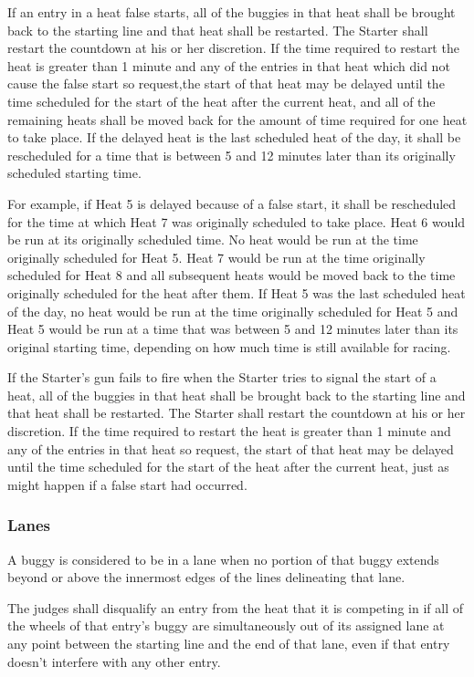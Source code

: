 If an entry in a heat false starts, all of the buggies in that heat shall be brought back to the starting line and that heat shall be restarted. The Starter shall restart the countdown at his or her discretion. If the time required to restart the heat is greater than 1 minute and any of the entries in that heat which did not cause the false start so request,the start of that heat may be delayed until the time scheduled for the start of the heat after the current heat, and all of the remaining heats shall be moved back for the amount of time required for one heat to take place. If the delayed heat is the last scheduled heat of the day, it shall be rescheduled for a time that is between 5 and 12 minutes later than its originally scheduled starting time.

For example, if Heat 5 is delayed because of a false start, it shall be rescheduled for the time at which Heat 7 was originally scheduled to take place. Heat 6 would be run at its originally scheduled time. No heat would be run at the time originally scheduled for Heat 5. Heat 7 would be run at the time originally scheduled for Heat 8 and all subsequent heats would be moved back to the time originally scheduled for the heat after them. If Heat 5 was the last scheduled heat of the day, no heat would be run at the time originally scheduled for Heat 5 and Heat 5 would be run at a time that was between 5 and 12 minutes later than its original starting time, depending on how much time is still available for racing.

If the Starter's gun fails to fire when the Starter tries to signal the start of a heat, all of the buggies in that heat shall be brought back to the starting line and that heat shall be restarted. The Starter shall restart the countdown at his or her discretion. If the time required to restart the heat is greater than 1 minute and any of the entries in that heat so request, the start of that heat may be delayed until the time scheduled for the start of the heat after the current heat, just as might happen if a false start had occurred.

\subsubsection{Lanes}

A buggy is considered to be in a lane when no portion of that buggy extends beyond or above the innermost edges of the lines delineating that lane.

The judges shall disqualify an entry from the heat that it is competing in if all of the wheels of that entry's buggy are simultaneously out of its assigned lane at any point between the starting line and the end of that lane, even if that entry doesn't interfere with any other entry.

